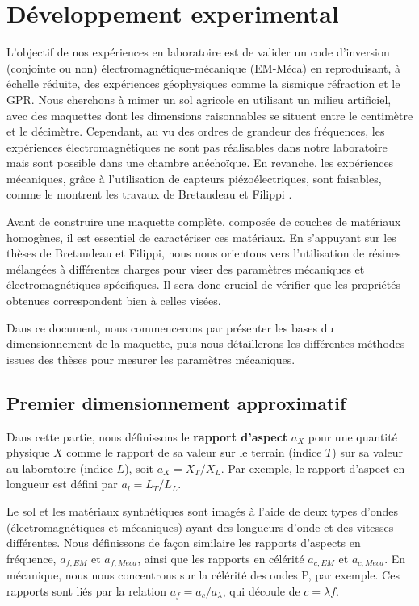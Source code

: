 \section{Développement experimental}

L’objectif de nos expériences en laboratoire est de valider un code d’inversion (conjointe ou non) électromagnétique-mécanique (EM-Méca) en reproduisant, à échelle réduite, des expériences géophysiques comme la sismique réfraction et le GPR. Nous cherchons à mimer un sol agricole en utilisant un milieu artificiel, avec des maquettes dont les dimensions raisonnables se situent entre le centimètre et le décimètre. Cependant, au vu des ordres de grandeur des fréquences, les expériences électromagnétiques ne sont pas réalisables dans notre laboratoire mais sont possible dans une chambre anéchoïque. En revanche, les expériences mécaniques, grâce à l’utilisation de capteurs piézoélectriques, sont faisables, comme le montrent les travaux de Bretaudeau \cite{bretaudeau} et Filippi   \cite{Filippi}.\par

Avant de construire une maquette complète, composée de couches de matériaux homogènes, il est essentiel de caractériser ces matériaux. En s’appuyant sur les thèses de Bretaudeau et Filippi, nous nous orientons vers l’utilisation de résines mélangées à différentes charges pour viser des paramètres mécaniques et électromagnétiques spécifiques. Il sera donc crucial de vérifier que les propriétés obtenues correspondent bien à celles visées.\par

Dans ce document, nous commencerons par présenter les bases du dimensionnement de la maquette, puis nous détaillerons les différentes méthodes issues des thèses pour mesurer les paramètres mécaniques.\par

\subsection{Premier dimensionnement approximatif}

Dans cette partie, nous définissons le \textbf{rapport d'aspect} $a_X$ pour une quantité physique $X$ comme le rapport de sa valeur sur le terrain (indice $T$) sur sa valeur au laboratoire (indice $L$), soit $a_X = X_T / X_L$. Par exemple, le rapport d'aspect en longueur est défini par $a_l = L_T / L_L$.

Le sol et les matériaux synthétiques sont imagés à l'aide de deux types d'ondes (électromagnétiques et mécaniques) ayant des longueurs d'onde et des vitesses différentes. Nous définissons de façon similaire les rapports d'aspects en fréquence, $a_{f,EM}$ et $a_{f,Meca}$, ainsi que les rapports en célérité $a_{c,EM}$ et $a_{c,Meca}$. En mécanique, nous nous concentrons sur la célérité des ondes P, par exemple. Ces rapports sont liés par la relation $a_f = a_c/a_{\lambda}$, qui découle de $c = \lambda f$.

